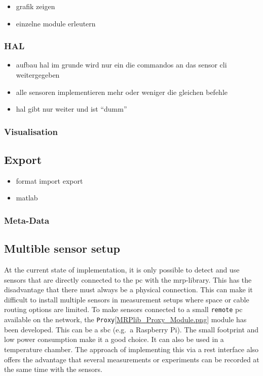\begin{itemize}
\tightlist
\item
  grafik zeigen
\item
  einzelne module erleutern
\end{itemize}

\hypertarget{hal}{%
\subsubsection{HAL}\label{hal}}

\begin{itemize}
\tightlist
\item
  aufbau hal im grunde wird nur ein die commandos an das sensor cli
  weitergegeben
\item
  alle sensoren implementieren mehr oder weniger die gleichen befehle
\item
  hal gibt nur weiter und ist ``dumm''
\end{itemize}

\hypertarget{visualisation}{%
\subsubsection{Visualisation}\label{visualisation}}

\hypertarget{export}{%
\subsection{Export}\label{export}}

\begin{itemize}
\tightlist
\item
  format import export
\item
  matlab
\end{itemize}

\hypertarget{meta-data}{%
\subsubsection{Meta-Data}\label{meta-data}}

\hypertarget{multible-sensor-setup}{%
\subsection{Multible sensor setup}\label{multible-sensor-setup}}

At the current state of implementation, it is only possible to detect
and use sensors that are directly connected to the \gls{pc} with the
\gls{mrp}-library. This has the disadvantage that there must always be a
physical connection. This can make it difficult to install multiple
sensors in measurement setups where space or cable routing options are
limited. To make sensors connected to a small
\passthrough{\lstinline!remote!} \gls{pc} available on the network, the
\passthrough{\lstinline!Proxy!}\ref{MRPlib_Proxy_Module.png} module has
been developed. This can be a \gls{sbc} (e.g.~a Raspberry Pi). The small
footprint and low power consumption make it a good choice. It can also
be used in a temperature chamber. The approach of implementing this via
a \gls{rest} interface also offers the advantage that several
measurements or experiments can be recorded at the same time with the
sensors.

